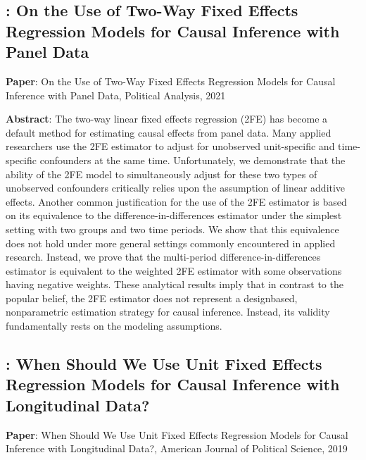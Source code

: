 \documentclass[12pt]{article}
\theoremstyle{definition}
\begin{document}
\subsection{\citet{imaiUseTwoWayFixed2021}: On the Use of Two-Way Fixed Effects Regression Models for Causal Inference with Panel Data}

{\bf Paper}: On the Use of Two-Way Fixed Effects Regression Models for Causal Inference with Panel Data, Political Analysis, 2021

{\bf Abstract}: The two-way linear fixed effects regression (2FE) has become a default method for estimating causal effects from panel data. Many applied researchers use the 2FE estimator to adjust for unobserved unit-specific and time-specific confounders at the same time. Unfortunately, we demonstrate that the ability of the 2FE model to simultaneously adjust for these two types of unobserved confounders critically relies upon the assumption of linear additive effects. Another common justification for the use of the 2FE estimator is based on its equivalence to the difference-in-differences estimator under the simplest setting with two groups and two time periods. We show that this equivalence does not hold under more general settings commonly encountered in applied research. Instead, we prove that the multi-period difference-in-differences estimator is equivalent to the weighted 2FE estimator with some observations having negative weights. These analytical results imply that in contrast to the popular belief, the 2FE estimator does not represent a designbased, nonparametric estimation strategy for causal inference. Instead, its validity fundamentally rests on the modeling assumptions.

\subsection{\citet{imaiWhenShouldWe2019}: When Should We Use Unit Fixed Effects Regression Models for Causal Inference with Longitudinal Data?}

{\bf Paper}: When Should We Use Unit Fixed Effects Regression Models for Causal Inference with Longitudinal Data?, American Journal of Political Science, 2019
\end{document}
